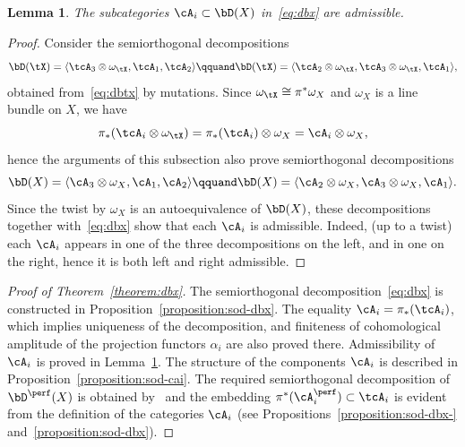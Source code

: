 \documentclass[11pt]{amsart}
\theoremstyle{plain}
\newtheorem{lemma}[theorem]{Lemma}
\theoremstyle{definition}
\theoremstyle{remark}
\begin{document}
\begin{lemma}
\label{lemma:cai-admissible}
The subcategories $\cA_i \subset \bD(X)$ in~\eqref{eq:dbx} are admissible.
\end{lemma}
\begin{proof}
Consider the semiorthogonal decompositions
\begin{equation*}
\bD(\tX) = \langle \tcA_3 \otimes \omega_\tX, \tcA_1, \tcA_2 \rangle
\qquand
\bD(\tX) = \langle \tcA_2 \otimes \omega_\tX, \tcA_3 \otimes \omega_\tX, \tcA_1 \rangle,
\end{equation*}
obtained from~\eqref{eq:dbtx} by mutations.
Since $\omega_\tX \cong \pi^*\omega_X$ and $\omega_X$ is a line bundle on $X$, we have 
\begin{equation*}
\pi_*(\tcA_i \otimes \omega_\tX) = \pi_*(\tcA_i) \otimes \omega_X = \cA_i \otimes \omega_X,
\end{equation*}
hence the arguments of this subsection also prove semiorthogonal decompositions
\begin{equation}\label{eq:dbx-other}
\bD(X) = \langle \cA_3 \otimes \omega_X, \cA_1, \cA_2 \rangle
\qquand
\bD(X) = \langle \cA_2 \otimes \omega_X, \cA_3 \otimes \omega_X, \cA_1 \rangle.
\end{equation}
Since the twist by $\omega_X$ is an autoequivalence of $\bD(X)$, these decompositions together with~\eqref{eq:dbx} 
show that each $\cA_i$ is admissible.
Indeed, (up to a twist) each $\cA_i$ appears in one of the three decompositions on the left, and in one on the right,
hence it is both left and right admissible.
\end{proof}

\begin{proof}[Proof of Theorem~\textup{\ref{theorem:dbx}}]
The semiorthogonal decomposition~\eqref{eq:dbx} is constructed in Proposition~\ref{proposition:sod-dbx}.
The equality $\cA_i = \pi_*(\tcA_i)$, which implies uniqueness of the decomposition, 
and finiteness of cohomological amplitude of the projection functors $\alpha_i$ are also proved there.
Admissibility of $\cA_i$ is proved in Lemma~\ref{lemma:cai-admissible}.
The structure of the components $\cA_i$ is described in Proposition~\ref{proposition:sod-cai}.
The required semiorthogonal decomposition of~$\bD^\perf(X)$ is obtained by~\cite[Proposition~4.1]{kuznetsov2011base}
and the embedding $\pi^*(\cA_i^\perf) \subset \tcA_i$ is evident from the definition
of the categories $\cA_i$ (see Propositions~\ref{proposition:sod-dbx-} and~\ref{proposition:sod-dbx}).
\end{proof}
\end{document}
